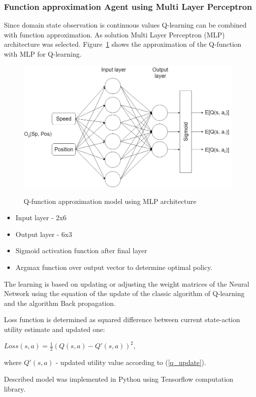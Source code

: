 \documentclass[12pt]{article}
\begin{document}
\subsubsection{Function approximation Agent using Multi Layer Perceptron}{
Since domain state observation is continuous values Q-learning can be combined with function approximation. As solution Multi Layer Perceptron (MLP) architecture was selected. Figure~\ref{mlp_model} shows the approximation of the Q-function with MLP for Q-learning.\par
\begin{figure}[h!]
\begin{center}
\includegraphics[scale=0.3]{images/mlp_model.png}
\label{mlp_model}
\caption{Q-function approximation model using MLP architecture}
\end{center}
\end{figure}
\begin{itemize}
\item Input layer - 2x6
\item Output layer - 6x3
\item Sigmoid activation function after final layer
\item Argmax function over output vector to determine optimal policy.
\end{itemize}
The learning is based on updating or adjusting the weight matrices of the Neural Network using the equation of the update of the classic algorithm of Q-learning and the algorithm Back propagation.\par
Loss function is determined as squared difference between current state-action utility estimate and updated one:
\begin{center}
$Loss(s, a) = \frac{1}{2}(Q(s, a) - Q'(s, a))^2$,
\end{center}
where $Q'(s, a)$ - updated utility value according to (\ref{q_update}).\par
Described model was implemented in Python using Tensorflow computation library.

}
\newpage
\end{document}
